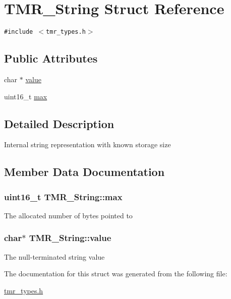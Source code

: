 \hypertarget{struct_t_m_r___string}{
\section{TMR\_\-String Struct Reference}
\label{struct_t_m_r___string}
}
{\tt \#include $<$tmr\_\-types.h$>$}

\subsection*{Public Attributes}
\begin{CompactItemize}
\item 
char $\ast$ \hyperlink{struct_t_m_r___string_157bc57398c4c0cf396058f11c688a44}{value}
\item 
uint16\_\-t \hyperlink{struct_t_m_r___string_4a71388268ce7055cab86c5fd302f454}{max}
\end{CompactItemize}


\subsection{Detailed Description}
Internal string representation with known storage size 

\subsection{Member Data Documentation}
\hypertarget{struct_t_m_r___string_4a71388268ce7055cab86c5fd302f454}{
\subsubsection[{max}]{\setlength{\rightskip}{0pt plus 5cm}uint16\_\-t {\bf TMR\_\-String::max}}}
\label{struct_t_m_r___string_4a71388268ce7055cab86c5fd302f454}


The allocated number of bytes pointed to \hypertarget{struct_t_m_r___string_157bc57398c4c0cf396058f11c688a44}{
\subsubsection[{value}]{\setlength{\rightskip}{0pt plus 5cm}char$\ast$ {\bf TMR\_\-String::value}}}
\label{struct_t_m_r___string_157bc57398c4c0cf396058f11c688a44}


The null-terminated string value 

The documentation for this struct was generated from the following file:\begin{CompactItemize}
\item 
\hyperlink{tmr__types_8h}{tmr\_\-types.h}\end{CompactItemize}

